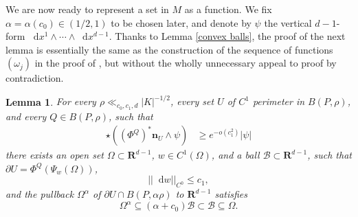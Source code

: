 \documentclass[reqno,10pt]{amsart}
\newcommand{\RR}{\mathbf{R}}
\newcommand*\dif{\mathop{}\!\mathrm{d}}
\newcommand{\normal}{\mathbf n}
\newtheorem{lemma}[theorem]{Lemma}
\theoremstyle{definition}
\numberwithin{equation}{section}
\begin{document}
We are now ready to represent a set in $M$ as a function.
We fix $\alpha = \alpha(c_0) \in (1/2, 1)$ to be chosen later, and denote by $\psi$ the vertical $d-1$-form $\dif x^1 \wedge \cdots \wedge \dif x^{d - 1}$.
Thanks to Lemma \ref{convex balls}, the proof of the next lemma is essentially the same as the construction of the sequence of functions $(\omega_j)$ in the proof of \cite[Lemma 6.4]{Giusti77}, but without the wholly unnecessary appeal to proof by contradiction.

\begin{lemma}\label{rep as a good graph}
For every $\rho \ll_{c_0, c_1, d} |K|^{-1/2}$, every set $U$ of $C^1$ perimeter in $B(P, \rho)$, and every $Q \in B(P, \rho)$, such that
\begin{align}
\star((\Phi^Q)^* \normal_U \wedge \psi) &\geq e^{-o(c_1^2)} |\psi| \label{rep as a good graph hyp}
\end{align}
there exists an open set $\Omega \subset \RR^{d - 1}$, $w \in C^1(\Omega)$, and a ball $\mathscr B \subset \RR^{d - 1}$, such that $\partial U = \Phi^Q(\Psi_w(\Omega))$,
\begin{equation}\label{rep as a good graph small derivative}
||\dif w||_{C^0} \leq c_1,
\end{equation}
and the pullback $\Omega^\alpha$ of $\partial U \cap B(P, \alpha \rho)$ to $\RR^{d - 1}$ satisfies
\begin{equation}\label{rep as a good graph set nests}
    \Omega^\alpha \subseteq (\alpha + c_0) \mathscr B \subset \mathscr B \subseteq \Omega.
\end{equation}
\end{lemma}
\end{document}
